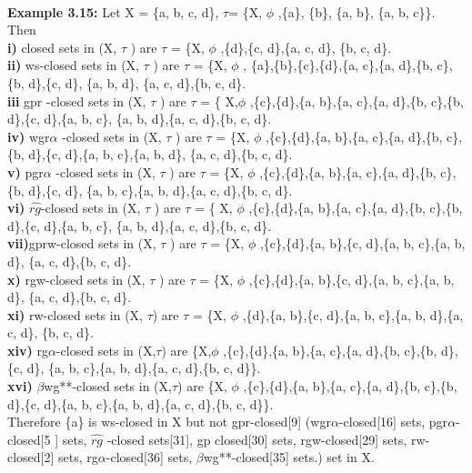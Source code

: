 {{			\\\textbf{Example 3.15:} Let X = \{a, b, c, d\}, $\tau$= \{X, $\phi$ ,\{a\}, \{b\}, \{a, b\}, \{a, b, c\}\}.  Then
			\\\textbf{i)} closed sets in (X, $\tau$ ) are $\tau$ = \{X, $\phi$ ,\{d\},\{c, d\},\{a, c, d\}, \{b, c, d\}.
			\\\textbf{ii)}	ws-closed sets in (X, $\tau$ ) are $\tau$ = \{X, $\phi$ , \{a\},\{b\},\{c\},\{d\},\{a, c\},\{a, d\},\{b, c\},\{b, d\},\{c, d\}, \{a, b, d\}, \{a, c, d\},\{b, c, d\}.
			\\\textbf{iii}	gpr -closed sets in (X, $\tau$ ) are $\tau$ = \{ X,$\phi$  ,\{c\},\{d\},\{a, b\},\{a, c\},\{a, d\},\{b, c\},\{b, d\},\{c, d\},\{a, b, c\}, \{a, b, d\},\{a, c, d\},\{b, c, d\}.
			\\\textbf{iv)} wgr$\alpha$ -closed sets in  (X, $\tau$ ) are $\tau$ = \{X, $\phi$ ,\{c\},\{d\},\{a, b\},\{a, c\},\{a, d\},\{b, c\},\{b, d\},\{c, d\},\{a, b, c\},\{a, b, d\}, \{a, c, d\},\{b, c, d\}.
			\\\textbf{v)} pgr$\alpha$ -closed sets in (X, $\tau$ ) are $\tau$ = \{X, $\phi$ ,\{c\},\{d\},\{a, b\},\{a, c\},\{a, d\},\{b, c\},\{b, d\},\{c, d\}, \{a, b, c\},\{a, b, d\},\{a, c, d\},\{b, c, d\}.
			\\\textbf{vi)} $\hat{rg}$-closed sets in (X, $\tau$ ) are $\tau$ = \{ X, $\phi$ ,\{c\},\{d\},\{a, b\},\{a, c\},\{a, d\},\{b, c\},\{b, d\},\{c, d\},\{a, b, c\}, \{a, b, d\},\{a, c, d\},\{b, c, d\}.
			\\\textbf{vii)}gprw-closed sets in (X, $\tau$ ) are $\tau$ = \{X, $\phi$ ,\{c\},\{d\},\{a, b\},\{c, d\},\{a, b, c\},\{a, b, d\}, \{a, c, d\},\{b, c, d\}.
			\\\textbf{x)} rgw-closed sets in (X, $\tau$ ) are $\tau$ = \{X, $\phi$ ,\{c\},\{d\},\{a, b\},\{c, d\},\{a, b, c\},\{a, b, d\}, \{a, c, d\},\{b, c, d\}.
			\\\textbf{xi)} rw-closed sets in (X,  $\tau$) are $\tau$ = \{X, $\phi$ ,\{d\},\{a, b\},\{c, d\},\{a, b, c\},\{a, b, d\},\{a, c, d\}, \{b, c, d\}.
			\\\textbf{xiv)} rg$\alpha$-closed sets in (X,$\tau$) are \{X,$\phi$ ,\{c\},\{d\},\{a, b\},\{a, c\},\{a, d\},\{b, c\},\{b, d\},\{c, d\}, \{a, b, c\},\{a, b, d\},\{a, c, d\},\{b, c, d\}\}.
			\\\textbf{xvi)}	$\beta$wg**-closed sets in (X,$\tau$) are \{X, $\phi$ ,\{c\},\{d\},\{a, b\},\{a, c\},\{a, d\},\{b, c\},\{b, d\},\{c, d\},\{a, b, c\},\{a, b, d\},\{a, c, d\},\{b, c, d\}\}.
			\\\indent Therefore \{a\} is ws-closed in X  but not gpr-closed[9] (wgr$\alpha$-closed[16] sets, pgr$\alpha$-closed[5 ] sets, $\widehat{rg}$ -closed sets[31], gp closed[30] sets, rgw-closed[29] sets, rw-closed[2] sets, rg$\alpha$-closed[36] sets, $\beta$wg**-closed[35] sets.) set  in X.
}}
